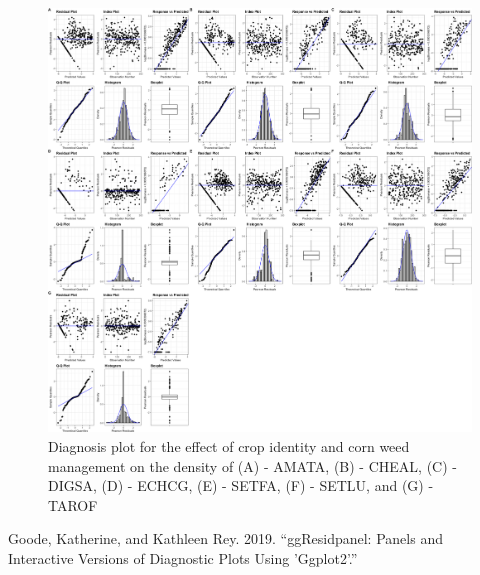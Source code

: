 \documentclass[
]{article}
\newlength{\cslhangindent}
\newlength{\cslentryspacingunit} %
\newenvironment{CSLReferences}[2] %
 {%
  \setlength{\parindent}{0pt}
  \ifodd #1
  \let\oldpar\par
  \def\par{\hangindent=\cslhangindent\oldpar}
  \fi
  \setlength{\parskip}{#2\cslentryspacingunit}
 }%
 {}
\begin{document}
\begin{figure}
\centering
\includegraphics{AppendixA-model-diagnosis_files/figure-latex/sp-biom-diag-1.png}
\caption{\label{fig:sp-biom-diag}Diagnosis plot for the effect of crop identity and corn weed management on the density of (A) - AMATA, (B) - CHEAL, (C) - DIGSA, (D) - ECHCG, (E) - SETFA, (F) - SETLU, and (G) - TAROF}
\end{figure}

\hypertarget{refs}{}
\begin{CSLReferences}{1}{0}
\leavevmode{}%
Goode, Katherine, and Kathleen Rey. 2019. {``{ggResidpanel}: {Panels} and Interactive Versions of Diagnostic Plots Using 'Ggplot2'.''}

\end{CSLReferences}
\end{document}
